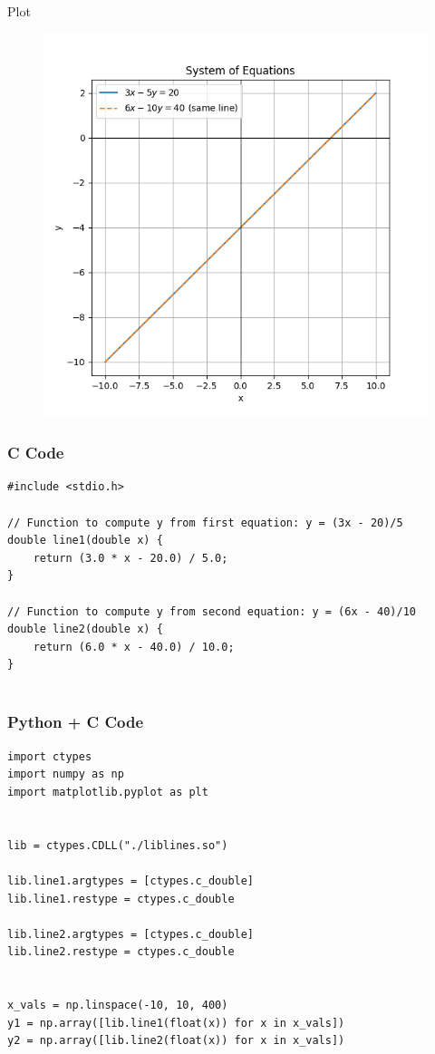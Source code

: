 \documentclass{beamer}
\begin{document}
\begin{frame}{Plot}
\begin{figure}[h!]
    \centering
    \includegraphics[height=0.5\textheight, keepaspectratio]{figs/Figure_1.png}
    \label{figure_1}
\end{figure}
\end{frame}

\begin{frame}[fragile]
    \frametitle{C Code}
    \begin{lstlisting}
#include <stdio.h>

// Function to compute y from first equation: y = (3x - 20)/5
double line1(double x) {
    return (3.0 * x - 20.0) / 5.0;
}

// Function to compute y from second equation: y = (6x - 40)/10
double line2(double x) {
    return (6.0 * x - 40.0) / 10.0;
}


    \end{lstlisting}
\end{frame}



\begin{frame}[fragile]
    \frametitle{Python + C Code}
    \begin{lstlisting}
import ctypes
import numpy as np
import matplotlib.pyplot as plt


lib = ctypes.CDLL("./liblines.so")

lib.line1.argtypes = [ctypes.c_double]
lib.line1.restype = ctypes.c_double

lib.line2.argtypes = [ctypes.c_double]
lib.line2.restype = ctypes.c_double


x_vals = np.linspace(-10, 10, 400)
y1 = np.array([lib.line1(float(x)) for x in x_vals])
y2 = np.array([lib.line2(float(x)) for x in x_vals])



    \end{lstlisting}
\end{frame}
\end{document}
